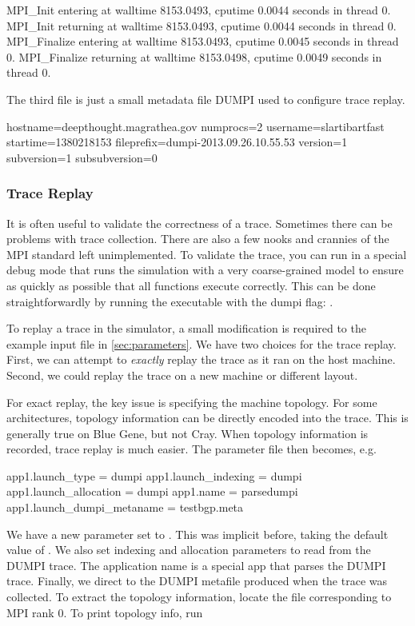 \begin{ViFile}
MPI_Init entering at walltime 8153.0493, cputime 0.0044 seconds in thread 0.
MPI_Init returning at walltime 8153.0493, cputime 0.0044 seconds in thread 0.
MPI_Finalize entering at walltime 8153.0493, cputime 0.0045 seconds in thread 0.
MPI_Finalize returning at walltime 8153.0498, cputime 0.0049 seconds in thread 0.
\end{ViFile}

The third file is just a small metadata file DUMPI used to configure trace replay.
\begin{ViFile}
hostname=deepthought.magrathea.gov
numprocs=2
username=slartibartfast
startime=1380218153
fileprefix=dumpi-2013.09.26.10.55.53
version=1
subversion=1
subsubversion=0
\end{ViFile}

\subsubsection{Trace Replay}
\label{subsec:dumpi:tracereplay}
It is often useful to validate the correctness of a trace.  Sometimes there can be problems with trace collection. 
There are also a few nooks and crannies of the MPI standard left unimplemented.
To validate the trace, you can run in a special debug mode that runs the simulation with a very coarse-grained model
to ensure as quickly as possible that all functions execute correctly.
This can be done straightforwardly by running the executable with the dumpi flag: .

To replay a trace in the simulator, a small modification is required to the example input file in \ref{sec:parameters}.
We have two choices for the trace replay.  First, we can attempt to \emph{exactly} replay the trace as it ran on the host machine.
Second, we could replay the trace on a new machine or different layout.

For exact replay, the key issue is specifying the machine topology.
For some architectures, topology information can be directly encoded into the trace.
This is generally true on Blue Gene, but not Cray.
When topology information is recorded, trace replay is much easier.
The parameter file then becomes, e.g.

\begin{ViFile}
app1.launch_type = dumpi
app1.launch_indexing = dumpi
app1.launch_allocation = dumpi
app1.name = parsedumpi
app1.launch_dumpi_metaname = testbgp.meta
\end{ViFile}
We have a new parameter  set to .
This was implicit before, taking the default value of .
We also set indexing and allocation parameters to read from the DUMPI trace.
The application name is a special app that parses the DUMPI trace.
Finally, we direct \sstmacro to the DUMPI metafile produced when the trace was collected.
To extract the topology information, locate the  file corresponding to MPI rank 0.
To print topology info, run

